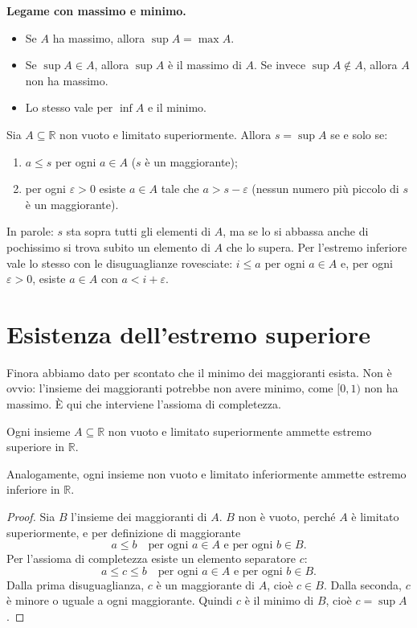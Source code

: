 \documentclass[11pt,a4paper]{article}
\begin{document}
\textbf{Legame con massimo e minimo.}
\begin{itemize}
    \item Se $A$ ha massimo, allora $\sup A = \max A$.
    \item Se $\sup A \in A$, allora $\sup A$ è il massimo di $A$. Se invece
          $\sup A \notin A$, allora $A$ non ha massimo.
    \item Lo stesso vale per $\inf A$ e il minimo.
\end{itemize}

\begin{teorema}
Sia $A \subseteq \mathbb{R}$ non vuoto e limitato superiormente. Allora
$s = \sup A$ se e solo se:
\begin{enumerate}
    \item $a \leq s$ per ogni $a \in A$ \quad ($s$ è un maggiorante);
    \item per ogni $\varepsilon > 0$ esiste $a \in A$ tale che
          $a > s - \varepsilon$ \quad (nessun numero più piccolo di $s$ è
          un maggiorante).
\end{enumerate}
\end{teorema}

In parole: $s$ sta sopra tutti gli elementi di $A$, ma se lo si abbassa
anche di pochissimo si trova subito un elemento di $A$ che lo supera. Per
l'estremo inferiore vale lo stesso con le disuguaglianze rovesciate:
$i \leq a$ per ogni $a \in A$ e, per ogni $\varepsilon > 0$, esiste
$a \in A$ con $a < i + \varepsilon$.

\section{Esistenza dell'estremo superiore}

Finora abbiamo dato per scontato che il minimo dei maggioranti esista. Non è
ovvio: l'insieme dei maggioranti potrebbe non avere minimo, come $[0, 1)$ non
ha massimo. È qui che interviene l'assioma di completezza.

\begin{teorema}
Ogni insieme $A \subseteq \mathbb{R}$ non vuoto e limitato superiormente
ammette estremo superiore in $\mathbb{R}$.

Analogamente, ogni insieme non vuoto e limitato inferiormente ammette
estremo inferiore in $\mathbb{R}$.
\end{teorema}

\begin{proof}
Sia $B$ l'insieme dei maggioranti di $A$. $B$ non è vuoto, perché $A$ è
limitato superiormente, e per definizione di maggiorante
\[
a \leq b \quad \text{per ogni } a \in A \text{ e per ogni } b \in B.
\]
Per l'assioma di completezza esiste un elemento separatore $c$:
\[
a \leq c \leq b \quad \text{per ogni } a \in A \text{ e per ogni } b \in B.
\]
Dalla prima disuguaglianza, $c$ è un maggiorante di $A$, cioè $c \in B$.
Dalla seconda, $c$ è minore o uguale a ogni maggiorante. Quindi $c$ è il
minimo di $B$, cioè $c = \sup A$.
\end{proof}
\end{document}
